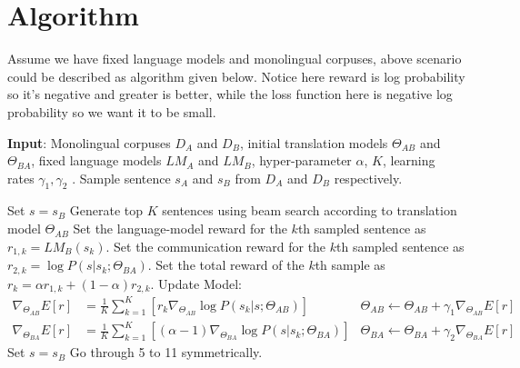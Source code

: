 \documentclass[11pt]{article}
\begin{document}
{\part{Algorithm}
Assume we have fixed language models and monolingual corpuses, above scenario could be described as algorithm given below. Notice here reward is log probability so it's negative and greater is better, while the loss function here is negative log probability so we want it to be small.
\begin{algorithm}
\begin{algorithmic}[1]
\State \textbf{Input}: Monolingual corpuses $D_A$ and $D_B$, initial translation models $\Theta_{AB}$ and $\Theta_{BA}$, fixed language models $LM_A$ and $LM_B$, hyper-parameter $\alpha$, $K$, learning rates $\gamma_1,\gamma_2$ .
\Repeat
\State Sample sentence $s_A$ and $s_B$ from $D_A$ and $ D_B$ respectively.

\State Set $s = s_B$
\State Generate top $K$ sentences using beam search according to translation model $\Theta_{AB}$
\State Set the language-model reward for the $k$th sampled sentence as $r_{1,k}=LM_B(s_{k})$.
\State Set the communication reward for the $k$th sampled sentence as $r_{2,k}=\log P(s|s_{k};\Theta_{BA})$.
\State Set the total reward of the $k$th sample as $r_k = \alpha r_{1,k} + (1-\alpha)r_{2,k}$.
\EndFor
\State Update Model:
\begin{align*}
\nabla_{\Theta_{AB}} E[r] &= \frac{1}{K}\sum^K_{k=1}[r_k\nabla_{\Theta_{AB}}\log P(s_{k}|s; \Theta_{AB})]&\Theta_{AB} \leftarrow\Theta_{AB} + \gamma_1\nabla_{\Theta_{AB}} E[r]\\
\nabla_{\Theta_{BA}} E[r] &= \frac{1}{K}\sum^K_{k=1} [(\alpha - 1)\nabla_{\Theta_{BA}} \log P(s|s_{k};\Theta_{BA})]&\Theta_{BA} \leftarrow\Theta_{BA} + \gamma_2\nabla_{\Theta_{BA}} E[r]
\end{align*}
\State Set $s = s_B$
\State Go through 5 to 11 symmetrically.
\end{algorithmic}
\end{algorithm}

}
\end{document}
